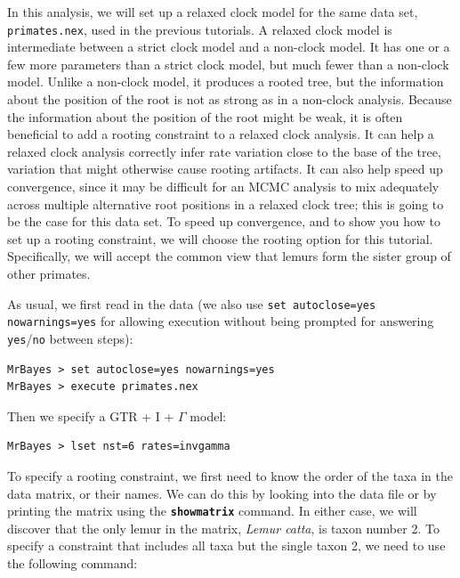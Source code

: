 \documentclass[12pt]{book}
\newcommand{\ttt}[1]{\texttt{#1}}
\newcommand{\tb}[1]{\ttt{\textbf{#1}}}
\begin{document}
In this analysis, we will set up a relaxed clock model for the same data set, \ttt{primates.nex},
used in the previous tutorials. A relaxed clock model is intermediate between a strict clock model
and a non-clock model. It has one or a few more parameters than a strict clock model, but much
fewer than a non-clock model. Unlike a non-clock model, it produces a rooted tree, but the
information about the position of the root is not as strong as in a non-clock analysis. Because the
information about the position of the root might be weak, it is often beneficial to add a rooting
constraint to a relaxed clock analysis. It can help a relaxed clock analysis correctly infer rate
variation close to the base of the tree, variation that might otherwise cause rooting artifacts. It
can also help speed up convergence, since it may be difficult for an MCMC analysis to mix
adequately across multiple alternative root positions in a relaxed clock tree; this is going to be
the case for this data set. To speed up convergence, and to show you how to set up a rooting
constraint, we will choose the rooting option for this tutorial. Specifically, we will accept the
common view that lemurs form the sister group of other primates.

As usual, we first read in the data (we also use \ttt{set autoclose=yes nowarnings=yes} for
allowing execution without being prompted for answering \ttt{yes}/\ttt{no} between steps):

\small
\begin{singlespacing}
\begin{verbatim}
MrBayes > set autoclose=yes nowarnings=yes
MrBayes > execute primates.nex
\end{verbatim}
\end{singlespacing}
\normalsize

Then we specify a GTR + I + $\Gamma$ model:

\small
\begin{singlespacing}
\begin{verbatim}
MrBayes > lset nst=6 rates=invgamma
\end{verbatim}
\end{singlespacing}
\normalsize

To specify a rooting constraint, we first need to know the order of the taxa in the data matrix, or
their names. We can do this by looking into the data file or by printing the matrix using the
\tb{showmatrix} command. In either case, we will discover that the only lemur in the matrix,
\textit{Lemur catta}, is taxon number 2. To specify a constraint that includes all taxa but the
single taxon 2, we need to use the following command:
\end{document}

